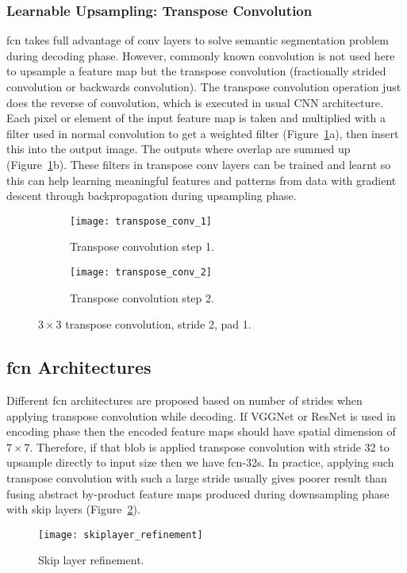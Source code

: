 \subsubsection{Learnable Upsampling: Transpose Convolution}
\acrfull{fcn} \cite{Long_2015_CVPR} takes full advantage of \acrshort{conv}
layers to solve semantic segmentation problem during decoding phase. However,
commonly known convolution is not used here to upsample a feature map but the
transpose convolution (fractionally strided convolution or backwards
convolution). The transpose convolution operation just does the reverse of
convolution, which is executed in usual CNN architecture. Each pixel or element
of the input feature map is taken and multiplied with a filter used in normal
convolution to get a weighted filter (Figure~\ref{fig:transpose_conv}a), then
insert this into the output image. The outputs where overlap are summed up
(Figure~\ref{fig:transpose_conv}b). These filters in transpose \acrshort{conv}
layers can be trained and learnt so this can help learning meaningful features
and patterns from data with gradient descent through backpropagation during
upsampling phase.
\begin{figure}[h]
    \centering
    \begin{subfigure}[b]{0.44\linewidth}
        \texttt{[image: transpose\_conv\_1]}
        \caption{Transpose convolution step 1.}
    \end{subfigure}
    \begin{subfigure}[b]{0.55\linewidth}
        \texttt{[image: transpose\_conv\_2]}
        \caption{Transpose convolution step 2.}
    \end{subfigure}
    \caption{$3 \times 3$ transpose convolution, stride 2, pad 1.}
    \label{fig:transpose_conv}
\end{figure}

\subsection{\acrshort{fcn} Architectures}
Different \acrshort{fcn} architectures are proposed based on number of strides
when applying transpose convolution while decoding. If VGGNet or ResNet is used
in encoding phase then the encoded feature maps should have spatial dimension of
$7 \times 7$. Therefore, if that blob is applied transpose convolution with
stride 32 to upsample directly to input size then we have \acrshort{fcn}-32s.
In practice, applying such transpose convolution with such a large stride
usually gives poorer result than fusing abstract by-product feature maps
produced during downsampling phase with skip layers
(Figure~\ref{fig:fcn_refinement}).
\begin{figure}[h]
    \centering
    \texttt{[image: skiplayer\_refinement]}
    \caption{Skip layer refinement.}
    \label{fig:fcn_refinement}
\end{figure}

